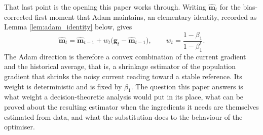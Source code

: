 \documentclass[pdflatex,sn-mathphys-num]{sn-jnl}%
\theoremstyle{thmstyleone}%
\theoremstyle{thmstyletwo}%
\theoremstyle{thmstylethree}%
\begin{document}
That last point is the opening this paper works through. Writing $\hat{\bm m}_t$ for the bias-corrected first moment that Adam maintains, an elementary identity, recorded as Lemma \ref{lem:adam_identity} below, gives
\begin{equation}
\label{eq:adam_convex}
\hat{\bm m}_t
=
\hat{\bm m}_{t-1}
+
w_t\bigl(\bm g_t-\hat{\bm m}_{t-1}\bigr),
\qquad
w_t=\frac{1-\beta_1}{1-\beta_1^{t}} .
\end{equation}
The Adam direction is therefore a convex combination of the current gradient and the historical average, that is, a shrinkage estimator of the population gradient that shrinks the noisy current reading toward a stable reference. Its weight is deterministic and is fixed by $\beta_1$. The question this paper answers is what weight a decision-theoretic analysis would put in its place, what can be proved about the resulting estimator when the ingredients it needs are themselves estimated from data, and what the substitution does to the behaviour of the optimiser.
\end{document}
